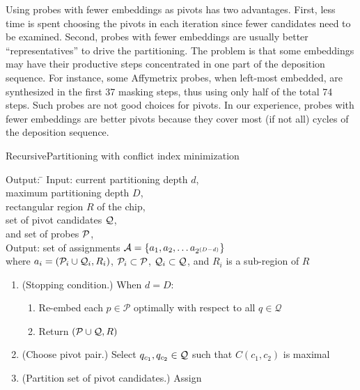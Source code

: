 Using probes with fewer embeddings as pivots has two advantages. First, less
time is spent choosing the pivots in each iteration since fewer candidates need
to be examined. Second, probes with fewer embeddings are usually better
``representatives'' to drive the partitioning. The problem is that some
embeddings may have their productive steps concentrated in one part of the
deposition sequence. For instance, some Affymetrix probes, when left-most
embedded, are synthesized in the first 37 masking steps, thus using only half of
the total 74 steps. Such probes are not good choices for pivots. In our
experience, probes with fewer embeddings are better pivots because they cover
most (if not all) cycles of the deposition sequence.

\begin{algorithm}[t!]
\caption{RecursivePartitioning with conflict index minimization}
\label{alg:pp_recurse}
\begin{minipage}{\textwidth}\footnotesize{
\begin{tabbing}
Output: \= \kill
Input:  \> current partitioning depth $d$, \\
        \> maximum partitioning depth $D$, \\
        \> rectangular region $R$ of the chip, \\
        \> set of pivot candidates ${\mathcal{Q}}$, \\
        \> and set of probes ${\mathcal{P}}$, \\
Output: \> set of assignments ${\mathcal{A}} = \{a_1, a_2, \dots a_{2^{(D-d)}}\}$ \\
        \> where $a_i = ({\mathcal{P}}_i \cup {\mathcal{Q}}_i, R_i)$, ${\mathcal{P}}_i \subset {\mathcal{P}}$,
           ${\mathcal{Q}}_i \subset {\mathcal{Q}}$, and $R_i$ is a sub-region of $R$
\end{tabbing}
\begin{enumerate}
\item \label{step:pp_stop} (Stopping condition.) When $d = D$:
  \begin{enumerate}
    \item Re-embed each $p \in \mathcal{P}$ optimally with respect to all
          $q \in \mathcal{Q}$
    \item Return $({\mathcal{P}} \cup {\mathcal{Q}}, R)$
  \end{enumerate}
\item (Choose pivot pair.) \label{step:pp_pivots} Select
      $q_{c_1}, q_{c_2} \in {\mathcal{Q}}$ such that $C(c_1,c_2)$ is maximal
\item \label{step:pp_part_pivots} (Partition set of pivot candidates.) Assign

\end{enumerate}}
\end{minipage}
\end{algorithm}
